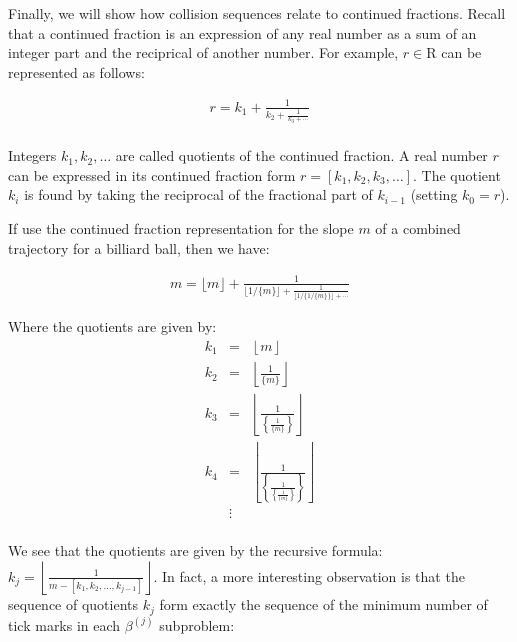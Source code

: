 Finally, we will show how collision sequences relate to continued fractions. Recall that a continued fraction is an expression of any real number as a sum of an integer part and the reciprical of another number. For example, $r \in \mathrm{R}$ can be represented as follows:

\begin{eqnarray}
r = k_1 + \frac{1}{k_2 + \frac{1}{k_3 + \cdots}} \\
\end{eqnarray}

Integers $k_1, k_2, \ldots$ are called quotients of the continued fraction. A real number $r$ can be expressed in its continued fraction form $r = [k_1, k_2, k_3, \ldots]$. The quotient $k_i$ is found by taking the reciprocal of the fractional part of $k_{i-1}$ (setting $k_0 = r$).

If use the continued fraction representation for the slope $m$ of a combined trajectory for a billiard ball, then we have:

\begin{eqnarray}
m = \lfloor m \rfloor + \frac{1}{\lfloor 1 / \{m\} \rfloor + \frac{1}{\lfloor 1/\{1/\{m\}\} \rfloor + \cdots}}
\end{eqnarray}

Where the quotients are given by:
\begin{eqnarray}
  k_1 &=& \left\lfloor m \right\rfloor \\
  k_2 &=& \left\lfloor \frac{1}{\{m\}} \right\rfloor \\
  k_3 &=& \left\lfloor \frac{1}{\left\{ \frac{1}{\{m\}} \right\}} \right\rfloor \\
  k_4 &=& \left\lfloor \frac{1}{\left\{ \frac{1}{\left\{\frac{1}{\{m\}}\right\}} \right\}} \right\rfloor \\
      &\vdots& \\
\end{eqnarray}

We see that the quotients are given by the recursive formula: $k_j = \left\lfloor \frac{1}{m - [k_1, k_2, \ldots, k_{j-1}]} \right\rfloor$. In fact, a more interesting observation is that the sequence of quotients $k_j$ form exactly the sequence of the minimum number of tick marks in each $\beta^{(j)}$ subproblem:

